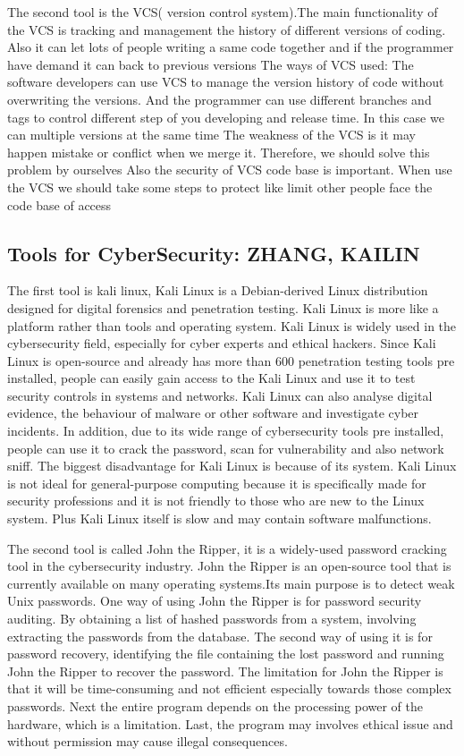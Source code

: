 \documentclass[a4paper, 11pt]{report}
\begin{document}
The second tool is the VCS( version control system).The main functionality of the VCS is tracking and management the history of different versions of coding. Also it can let lots of people writing a same code together and if the programmer have demand it can back to previous versions \cite{VCS1}
The ways of VCS used:
The software developers can use VCS to manage the version history of code without overwriting the versions. And the programmer can use different branches and tags to control different step of you developing and release time. In this case we can multiple versions at the same time
The weakness of the VCS is it may happen mistake or conflict when we merge it. Therefore, we should solve this problem by ourselves Also the security of VCS code base is important. When use the VCS we should take some steps to protect like limit other people face the code base of access \cite{VCS2}

\subsection{Tools for CyberSecurity: ZHANG, KAILIN }
The first tool is kali linux, Kali Linux is a Debian-derived Linux distribution designed for digital forensics and penetration testing. Kali Linux is more like a platform rather than tools and operating system. Kali Linux is widely used in the cybersecurity field, especially for cyber experts and ethical hackers\cite{OS}.
Since Kali Linux is open-source and already has more than 600 penetration testing tools pre installed, people can easily gain access to the Kali Linux and use it to test security controls in systems and networks. Kali Linux can also analyse digital evidence, the behaviour of malware or other software and investigate cyber incidents. In addition, due to its wide range of cybersecurity tools pre installed, people can use it to crack the password, scan for vulnerability and also network sniff\cite{AD}.
The biggest disadvantage for Kali Linux is because of its system. Kali Linux is not ideal for general-purpose computing because it is specifically made for security professions and it is not friendly to those who are new to the Linux system. Plus Kali Linux itself is slow and may contain software malfunctions\cite{DI}.

The second tool is called John the Ripper, it is a widely-used password cracking tool in the cybersecurity industry. John the Ripper is an open-source tool that is currently available on many operating systems.Its main purpose is to detect weak Unix passwords.
One way of using John the Ripper is for password security auditing. By obtaining a list of hashed passwords from a system, involving extracting the passwords from the database. The second way of using it is for password recovery, identifying the file containing the lost password and running John the Ripper to recover the password\cite{Open}.
The limitation for John the Ripper is that it will be time-consuming and not efficient especially towards those complex passwords. Next the entire program depends on the processing power of the hardware, which is a limitation. Last, the program may involves ethical issue and without permission may cause illegal consequences\cite{Sys}.
\end{document}
